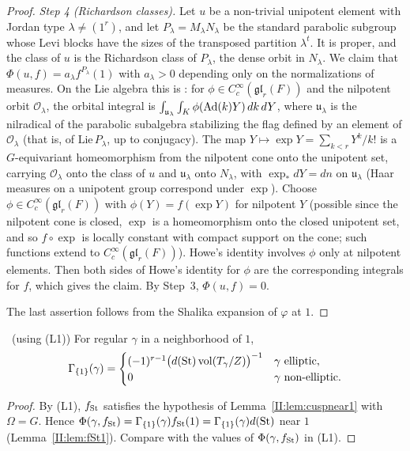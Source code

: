 \begin{proof}
\emph{Step 4 (Richardson classes).} Let $u$ be a non-trivial unipotent element with Jordan type $\lambda\ne(1^r)$, and let $P_\lambda=M_\lambda N_\lambda$ be the standard parabolic subgroup whose Levi blocks have the sizes of the transposed partition $\lambda^t$. It is proper, and the class of $u$ is the Richardson class of $P_\lambda$, the dense orbit in $N_\lambda$. We claim that $\Phi(u,f)=a_\lambda f^{P_\lambda}(1)$ with $a_\lambda>0$ depending only on the normalizations of measures. On the Lie algebra this is \cite[Proposition~5]{How74} \Ev: for $\phi\in C_c^\infty(\mathfrak{gl}_r(F))$ and the nilpotent orbit $\mathcal O_\lambda$, the orbital integral is $\int_{\mathfrak u_\lambda}\int_K\phi(\operatorname{Ad}(k)Y)\,dk\,dY$, where $\mathfrak u_\lambda$ is the nilradical of the parabolic subalgebra stabilizing the flag defined by an element of $\mathcal O_\lambda$ (that is, of $\mathrm{Lie}\,P_\lambda$, up to conjugacy). The map $Y\mapsto\exp Y=\sum_{k<r}Y^k/k!$ is a $G$-equivariant homeomorphism from the nilpotent cone onto the unipotent set, carrying $\mathcal O_\lambda$ onto the class of $u$ and $\mathfrak u_\lambda$ onto $N_\lambda$, with $\exp_*dY=dn$ on $\mathfrak u_\lambda$ (Haar measures on a unipotent group correspond under $\exp$). Choose $\phi\in C_c^\infty(\mathfrak{gl}_r(F))$ with $\phi(Y)=f(\exp Y)$ for nilpotent $Y$ (possible since the nilpotent cone is closed, $\exp$ is a homeomorphism onto the closed unipotent set, and so $f\circ\exp$ is locally constant with compact support on the cone; such functions extend to $C_c^\infty(\mathfrak{gl}_r(F))$). Howe's identity involves $\phi$ only at nilpotent elements. Then both sides of Howe's identity for $\phi$ are the corresponding integrals for $f$, which gives the claim. By Step~3, $\Phi(u,f)=0$.

The last assertion follows from the Shalika expansion of $\varphi$ at $1$.
\end{proof}

\begin{corollary}\label{II:cor:trivgerm}\ (using (L1))
For regular $\gamma$ in a neighborhood of $1$,
\[ \Gamma_{\{1\}}(\gamma)=\begin{cases}(-1)^{r-1}\big(d(\mathrm{St})\operatorname{vol}(T_\gamma/Z)\big)^{-1}&\gamma\text{ elliptic},\\ 0&\gamma\text{ non-elliptic}.\end{cases} \]
\end{corollary}
\begin{proof}
By (L1), $f_{\mathrm{St}}$ satisfies the hypothesis of Lemma~\ref{II:lem:cuspnear1} with $\Omega=G$. Hence $\Phi(\gamma,f_{\mathrm{St}})=\Gamma_{\{1\}}(\gamma)f_{\mathrm{St}}(1)=\Gamma_{\{1\}}(\gamma)d(\mathrm{St})$ near $1$ (Lemma~\ref{II:lem:fSt1}). Compare with the values of $\Phi(\gamma,f_{\mathrm{St}})$ in (L1).
\end{proof}

